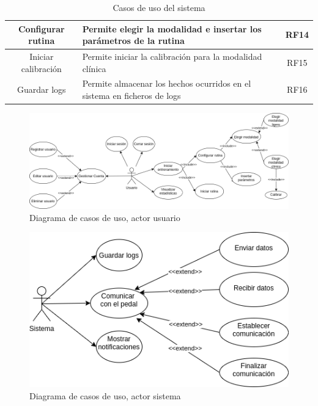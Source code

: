 \begin{table}[ht]
\begin{tabularx}{\textwidth}{|c|X|c|}
        Configurar rutina & Permite elegir la modalidad e insertar los parámetros de la rutina  & RF14\\\hline
        Iniciar calibración & Permite iniciar la calibración para la modalidad clínica  & RF15\\\hline
        Guardar logs & Permite almacenar los hechos ocurridos en el sistema en ficheros de logs & RF16\\\hline
    \end{tabularx}
    \caption{Casos de uso del sistema}
    \label{tab: rf}
\end{table}
    
\vspace*{50pt}
\begin{figure}[h]
    \centering
    \includegraphics[scale=0.44]{images/diagram-usecase-user.png}
    \caption{Diagrama de casos de uso, actor usuario}
    \label{fig: use-cases-user}
\end{figure}

\vspace*{50pt}
\begin{figure}[h]
    \centering
    \includegraphics[scale=0.44]{images/diagram-usecase-system.png}
    \caption{Diagrama de casos de uso, actor sistema}
    \label{fig: use-cases-system}
\end{figure}